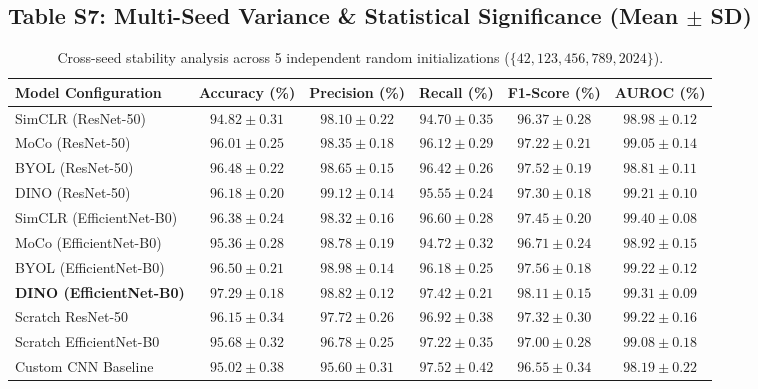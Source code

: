 \documentclass[11pt,a4paper]{article}
\begin{document}
\subsection*{Table S7: Multi-Seed Variance \& Statistical Significance (Mean $\pm$ SD)}
\begin{table}[htbp]
\centering
\caption{Cross-seed stability analysis across 5 independent random initializations ($\{42, 123, 456, 789, 2024\}$).}
\label{tab:s7_variance}
\begin{adjustbox}{max width=\textwidth}
\begin{tabular}{l c c c c c}
\toprule
\textbf{Model Configuration} & \textbf{Accuracy (\%)} & \textbf{Precision (\%)} & \textbf{Recall (\%)} & \textbf{F1-Score (\%)} & \textbf{AUROC (\%)} \\
\midrule
SimCLR (ResNet-50) & $94.82 \pm 0.31$ & $98.10 \pm 0.22$ & $94.70 \pm 0.35$ & $96.37 \pm 0.28$ & $98.98 \pm 0.12$ \\
MoCo (ResNet-50)   & $96.01 \pm 0.25$ & $98.35 \pm 0.18$ & $96.12 \pm 0.29$ & $97.22 \pm 0.21$ & $99.05 \pm 0.14$ \\
BYOL (ResNet-50)   & $96.48 \pm 0.22$ & $98.65 \pm 0.15$ & $96.42 \pm 0.26$ & $97.52 \pm 0.19$ & $98.81 \pm 0.11$ \\
DINO (ResNet-50)   & $96.18 \pm 0.20$ & $99.12 \pm 0.14$ & $95.55 \pm 0.24$ & $97.30 \pm 0.18$ & $99.21 \pm 0.10$ \\
SimCLR (EfficientNet-B0) & $96.38 \pm 0.24$ & $98.32 \pm 0.16$ & $96.60 \pm 0.28$ & $97.45 \pm 0.20$ & $99.40 \pm 0.08$ \\
MoCo (EfficientNet-B0)   & $95.36 \pm 0.28$ & $98.78 \pm 0.19$ & $94.72 \pm 0.32$ & $96.71 \pm 0.24$ & $98.92 \pm 0.15$ \\
BYOL (EfficientNet-B0)   & $96.50 \pm 0.21$ & $98.98 \pm 0.14$ & $96.18 \pm 0.25$ & $97.56 \pm 0.18$ & $99.22 \pm 0.12$ \\
\textbf{DINO (EfficientNet-B0)} & $\mathbf{97.29 \pm 0.18}$ & $\mathbf{98.82 \pm 0.12}$ & $\mathbf{97.42 \pm 0.21}$ & $\mathbf{98.11 \pm 0.15}$ & $\mathbf{99.31 \pm 0.09}$ \\
\midrule
Scratch ResNet-50        & $96.15 \pm 0.34$ & $97.72 \pm 0.26$ & $96.92 \pm 0.38$ & $97.32 \pm 0.30$ & $99.22 \pm 0.16$ \\
Scratch EfficientNet-B0  & $95.68 \pm 0.32$ & $96.78 \pm 0.25$ & $97.22 \pm 0.35$ & $97.00 \pm 0.28$ & $99.08 \pm 0.18$ \\
Custom CNN Baseline      & $95.02 \pm 0.38$ & $95.60 \pm 0.31$ & $97.52 \pm 0.42$ & $96.55 \pm 0.34$ & $98.19 \pm 0.22$ \\
\bottomrule
\end{tabular}
\end{adjustbox}
\end{table}
\end{document}
